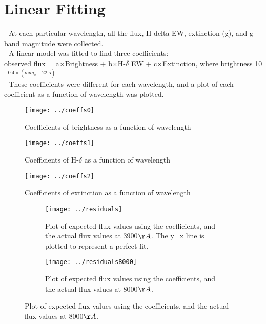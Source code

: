 \documentclass[12pt]{article}
\begin{document}
\section{Linear Fitting}
- At each particular wavelength, all the flux, H-delta EW, extinction (g), and g-band magnitude were collected. \\
- A linear model was fitted to find three coefficients:\\
observed flux = a$\times$Brightness + b$\times$H-$\delta$ EW + c$\times$Extinction, where brightness 10$^{-0.4 \times (mag_g - 22.5)}$\\
- These coefficients were different for each wavelength, and a plot of each coefficient as a function of wavelength was plotted.\\
\begin{figure}
\texttt{[image: ../coeffs0]}\\
\caption{Coefficients of brightness as a function of wavelength}
\end{figure}
\begin{figure}
\texttt{[image: ../coeffs1]}\\
\caption{Coefficients of H-$\delta$ as a function of wavelength}
\end{figure}
\begin{figure}
\texttt{[image: ../coeffs2]}\\
\caption{Coefficients of extinction as a function of wavelength}
\end{figure}
\begin{figure}
\begin{subfigure}{.5\textwidth}
\texttt{[image: ../residuals]}\\
\caption{Plot of expected flux values using the coefficients, and the actual flux values at 3900$\AA$. The y=x line is plotted to represent a perfect fit.}
\end{subfigure}
\begin{subfigure}{.5\textwidth}
\texttt{[image: ../residuals8000]}\\
\caption{Plot of expected flux values using the coefficients, and the actual flux values at 8000$\AA$.}
\end{subfigure}
\end{figure}
\end{document}
